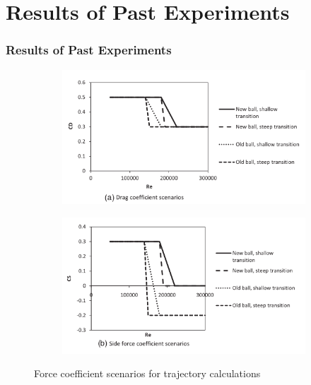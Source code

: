\documentclass{beamer}
\begin{document}
\section{Results of Past Experiments}
\begin{frame}
\frametitle{Results of Past Experiments}

\begin{figure}[h!]
  \centering
  \begin{subfigure}[b]{0.5\linewidth}
    \includegraphics[width=\linewidth]{./figs/my_8.png}
  \end{subfigure}
  \begin{subfigure}[b]{0.5\linewidth}
    \includegraphics[width=\linewidth]{./figs/my_9.png}
  \end{subfigure}
  \caption{Force coefficient scenarios for trajectory calculations}
  \label{fig:side3}
\end{figure}
\end{frame}
\end{document}
